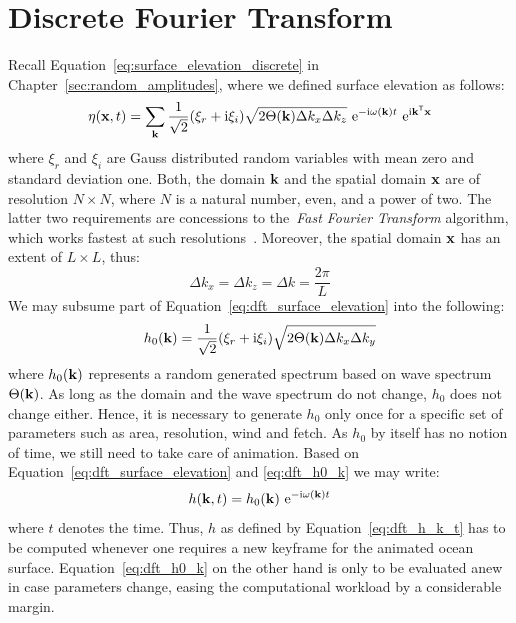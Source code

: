 \section{Discrete Fourier Transform}
\label{sec:discrete_fourier_transform}
Recall Equation~\ref{eq:surface_elevation_discrete} in Chapter~\ref{sec:random_amplitudes},
where we defined surface elevation as follows:
\begin{equation}
\label{eq:dft_surface_elevation}
\eta(\mathbf{x}, t) = 
\sum_{\mathbf{k}}\frac{1}{\sqrt{2}}(\xi_r+\mathrm{i}\xi_i)
\sqrt{2\Theta(\mathbf{k})\Delta k_x \Delta k_z} 
~\mathrm{e}^{-\mathrm{i}\omega(\mathbf{k})t}
~\mathrm{e}^{\mathrm{i}\mathbf{k}^{\mathsf{T}}\mathbf{x}}
\end{equation}
where $\xi_r$ and $\xi_i$ are Gauss distributed random variables with mean zero 
and standard deviation one. Both, the \wavevector domain $\mathbf{k}$ and the
spatial domain $\mathbf{x}$ are of resolution $N \times N$, where $N$ is a natural
number, even, and a power of two. The latter two requirements are concessions to
the~\emph{Fast Fourier Transform} algorithm, which works fastest at such
resolutions~\citep{Cooley:1965}.
Moreover, the spatial domain $\mathbf{x}$ has an extent of $L \times L$, thus:
\begin{equation*}
	\Delta k_x = \Delta k_z = \Delta k = \frac{2\pi}{L}
\end{equation*}
We may subsume part of Equation~\ref{eq:dft_surface_elevation} into the
following:
\begin{equation}
\label{eq:dft_h0_k}
h_0(\mathbf{k}) = \frac{1}{\sqrt{2}}(\xi_r+\mathrm{i}\xi_i)\sqrt{2\Theta(\mathbf{k})\Delta k_x \Delta k_y}
\end{equation}
where $h_0(\mathbf{k})$ represents a random generated spectrum based on wave
spectrum $\Theta(\mathbf{k})$. As long as the \wavevector domain and the wave
spectrum do not change, $h_0$ does not change either. Hence, it is necessary to
generate $h_0$ only once for a specific set of parameters such as area,
resolution, wind and fetch. As $h_0$ by itself has no notion of time,
we still need to take care of animation. Based on Equation~\ref{eq:dft_surface_elevation}
and \ref{eq:dft_h0_k} we may write:
\begin{equation}
\label{eq:dft_h_k_t}
h(\mathbf{k},t) = h_0(\mathbf{k})~\mathrm{e}^{-\mathrm{i}\omega(\mathbf{k})t}
\end{equation}
where $t$ denotes the time.
Thus, $h$ as defined by Equation~\ref{eq:dft_h_k_t} has to be computed whenever
one requires a new keyframe for the animated ocean surface.
Equation~\ref{eq:dft_h0_k} on the other hand is only to be evaluated anew in
case parameters change, easing the computational workload by a
considerable margin.
%
